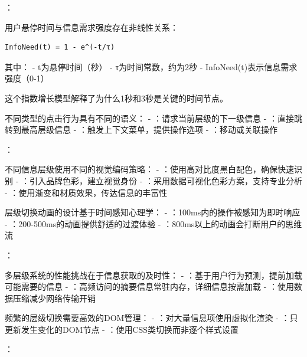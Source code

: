 ：


用户悬停时间与信息需求强度存在非线性关系：

\begin{lstlisting}
InfoNeed(t) = 1 - e^(-t/τ)
\end{lstlisting}

其中： - t为悬停时间（秒） - τ为时间常数，约为2秒 - InfoNeed(t)表示信息需求强度（0-1）

这个指数增长模型解释了为什么1秒和3秒是关键的时间节点。


不同类型的点击行为具有不同的语义： - ：请求当前层级的下一级信息 - ：直接跳转到最高层级信息 - ：触发上下文菜单，提供操作选项 - ：移动或关联操作

：


不同信息层级使用不同的视觉编码策略： - ：使用高对比度黑白配色，确保快速识别 - ：引入品牌色彩，建立视觉身份 - ：采用数据可视化色彩方案，支持专业分析 - ：使用渐变和材质效果，传达信息的丰富性


层级切换动画的设计基于时间感知心理学： - ：100ms内的操作被感知为即时响应 - ：200-500ms的动画提供舒适的过渡体验 - ：800ms以上的动画会打断用户的思维流

：


多层级系统的性能挑战在于信息获取的及时性： - ：基于用户行为预测，提前加载可能需要的信息 - ：高频访问的摘要信息常驻内存，详细信息按需加载 - ：使用数据压缩减少网络传输开销


频繁的层级切换需要高效的DOM管理： - ：对大量信息项使用虚拟化渲染 - ：只更新发生变化的DOM节点 - ：使用CSS类切换而非逐个样式设置

：


